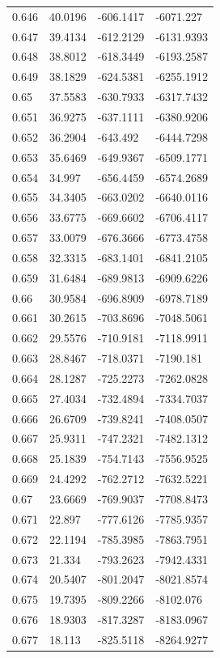 \begin{tabular}{llll}
0.646 & 40.0196 & -606.1417 & -6071.227 \\
0.647 & 39.4134 & -612.2129 & -6131.9393 \\
0.648 & 38.8012 & -618.3449 & -6193.2587 \\
0.649 & 38.1829 & -624.5381 & -6255.1912 \\
0.65 & 37.5583 & -630.7933 & -6317.7432 \\
0.651 & 36.9275 & -637.1111 & -6380.9206 \\
0.652 & 36.2904 & -643.492 & -6444.7298 \\
0.653 & 35.6469 & -649.9367 & -6509.1771 \\
0.654 & 34.997 & -656.4459 & -6574.2689 \\
0.655 & 34.3405 & -663.0202 & -6640.0116 \\
0.656 & 33.6775 & -669.6602 & -6706.4117 \\
0.657 & 33.0079 & -676.3666 & -6773.4758 \\
0.658 & 32.3315 & -683.1401 & -6841.2105 \\
0.659 & 31.6484 & -689.9813 & -6909.6226 \\
0.66 & 30.9584 & -696.8909 & -6978.7189 \\
0.661 & 30.2615 & -703.8696 & -7048.5061 \\
0.662 & 29.5576 & -710.9181 & -7118.9911 \\
0.663 & 28.8467 & -718.0371 & -7190.181 \\
0.664 & 28.1287 & -725.2273 & -7262.0828 \\
0.665 & 27.4034 & -732.4894 & -7334.7037 \\
0.666 & 26.6709 & -739.8241 & -7408.0507 \\
0.667 & 25.9311 & -747.2321 & -7482.1312 \\
0.668 & 25.1839 & -754.7143 & -7556.9525 \\
0.669 & 24.4292 & -762.2712 & -7632.5221 \\
0.67 & 23.6669 & -769.9037 & -7708.8473 \\
0.671 & 22.897 & -777.6126 & -7785.9357 \\
0.672 & 22.1194 & -785.3985 & -7863.7951 \\
0.673 & 21.334 & -793.2623 & -7942.4331 \\
0.674 & 20.5407 & -801.2047 & -8021.8574 \\
0.675 & 19.7395 & -809.2266 & -8102.076 \\
0.676 & 18.9303 & -817.3287 & -8183.0967 \\
0.677 & 18.113 & -825.5118 & -8264.9277 \\

\end{tabular}
